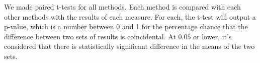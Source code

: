 We made paired t-tests for all methods. Each method is compared with each other methods with the results of each measure. For each, the t-test will output a p-value, which is a number between 0 and 1 for the percentage chance that the difference between two sets of results is coincidental. At $0.05$ or lower, it's considered that there is statistically significant difference in the means of the two sets.